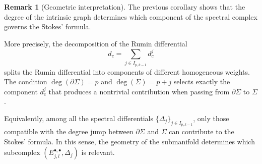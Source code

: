 \documentclass[dvipsnames]{amsart}
\theoremstyle{definition}
\newtheorem{remark}[theorem]{Remark}
\theoremstyle{definition}
\numberwithin{equation}{section}
\begin{document}
\begin{remark}[Geometric interpretation]
The previous corollary shows that the degree of the intrinsic graph determines which component of the spectral complex governs the Stokes' formula. 

More precisely, the decomposition of the Rumin differential
\[
d_c = \sum_{j\in I_{p,k-1}} d_c^j
\]
splits the Rumin differential into components of different homogeneous weights. The condition $\deg(\partial\Sigma)=p$ and $\deg(\Sigma)=p+j$ selects exactly the component $d_c^j$ that produces a nontrivial contribution when passing from $\partial\Sigma$ to $\Sigma$.

Equivalently, among all the spectral differentials $\{\Delta_j\}_{j\in I_{p,k-1}}$, only those compatible with the degree jump between $\partial\Sigma$ and $\Sigma$ can contribute to the Stokes' formula. In this sense, the geometry of the submanifold determines which subcomplex $(E_{j,l}^{\bullet,\bullet},\Delta_j)$ is relevant.
\end{remark}
\end{document}
